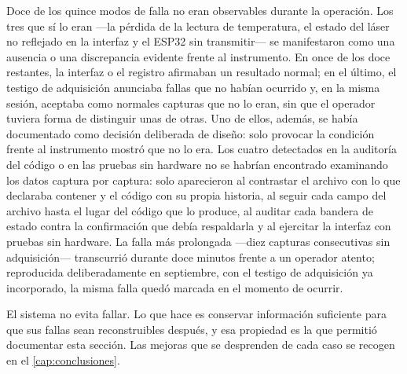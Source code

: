 Doce de los quince modos de falla no eran observables durante la
operación. Los tres que sí lo eran ---la pérdida de la lectura de
temperatura, el estado del láser no reflejado en la interfaz y el ESP32
sin transmitir--- se manifestaron como una ausencia o una discrepancia
evidente frente al instrumento. En once de los doce restantes, la
interfaz o el registro afirmaban un resultado normal; en el último, el
testigo de adquisición anunciaba fallas que no habían ocurrido y, en
la misma sesión, aceptaba como normales capturas que no lo eran, sin
que el operador tuviera forma de distinguir unas de otras. Uno de ellos, además, se
había documentado como decisión deliberada de diseño: solo provocar la
condición frente al instrumento mostró que no lo era. Los cuatro
detectados en la auditoría del código o en las pruebas sin hardware no
se habrían encontrado examinando los datos captura por captura: solo
aparecieron al contrastar el archivo con lo que declaraba contener y el código con su
propia historia, al seguir cada campo del archivo hasta el lugar del
código que lo produce, al auditar cada bandera de estado contra la
confirmación que debía respaldarla y al ejercitar la interfaz con
pruebas sin hardware. La falla más prolongada ---diez capturas
consecutivas sin adquisición--- transcurrió durante doce minutos frente
a un operador atento; reproducida deliberadamente en septiembre, con
el testigo de adquisición ya incorporado, la misma falla quedó marcada
en el momento de ocurrir.

El sistema no evita fallar. Lo que hace es conservar información
suficiente para que sus fallas sean reconstruibles después, y esa
propiedad es la que permitió documentar esta sección. Las mejoras que se
desprenden de cada caso se recogen en el \cref{cap:conclusiones}.
